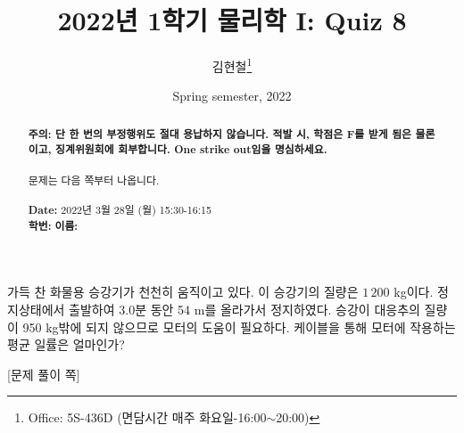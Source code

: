 \documentclass[floatfix,nofootinbib,superscriptaddress,fleqn,preprint]{revtex4}
\begin{document}
\title{\Large 2022년 1학기 물리학 I: Quiz 8}
\author{김현철\footnote{Office: 5S-436D (면담시간 매주
    화요일-16:00$\sim$20:00)}} 
\date{Spring semester, 2022}


\vspace{1.cm}
\begin{abstract}
\noindent \textbf{ {\color{red}주의}: \color{blue} 단 한 번의 부정행위도 절대
  용납하지 않습니다. 적발 시, 학점은 F를 받게 됨은 물론이고,
  징계위원회에 회부합니다. One strike out임을 명심하세요.}\\
\\
문제는 다음 쪽부터 나옵니다.  \\ \\
{\bf Date:} 2022년 3월 28일 (월) 15:30-16:15 
\\
{\bf 학번:} \hspace{4cm}
{\bf 이름:} 

\end{abstract}
\maketitle

가득 찬 화물용 승강기가 천천히 움직이고
있다. 이 승강기의 질량은 $1\,200$ kg이다. 정지상태에서 출발하여 3.0분
동안 54 m를 올라가서 정지하였다. 승강이 대응추의 질량이 950 kg밖에
되지 않으므로 모터의 도움이 필요하다. 케이블을 통해 모터에 작용하는
평균 일률은 얼마인가?

\newpage

{\color{gray} [문제 풀이 쪽]}

\newpage 
\end{document}
